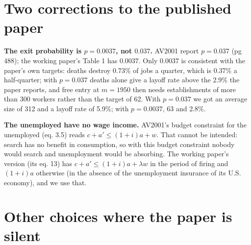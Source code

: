 \documentclass[11pt,fleqn]{article}
\begin{document}
\section{Two corrections to the published paper}
\label{sec:typos}

\textbf{The exit probability is $p=0.0037$, not $0.037$.} AV2001 report $p=0.037$ (pg 488); the working paper's Table 1 has $0.0037$. Only $0.0037$ is consistent with the paper's own targets: deaths destroy 0.73\% of jobs a quarter, which is 0.37\% a half-quarter; with $p=0.037$ deaths alone give a layoff rate above the 2.9\% the paper reports, and free entry at $m=1950$ then needs establishments of more than 300 workers rather than the target of 62. With $p=0.037$ we got an average size of 312 and a layoff rate of 5.9\%; with $p=0.0037$, 63 and 2.8\%.

\textbf{The unemployed have no wage income.} AV2001's budget constraint for the unemployed (eq. 3.5) reads $c+a'\leq(1+i)a+w$. That cannot be intended: search has no benefit in consumption, so with this budget constraint nobody would search and unemployment would be absorbing. The working paper's version (its eq. 13) has $c+a'\leq(1+i)a+\lambda w$ in the period of firing and $(1+i)a$ otherwise (in the absence of the unemployment insurance of its U.S. economy), and we use that.


\section{Other choices where the paper is silent}
\end{document}
